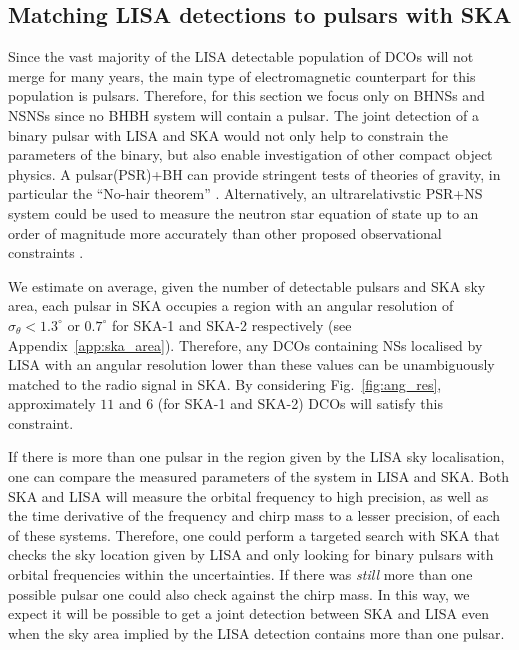 \subsection{Matching LISA detections to pulsars with SKA}\label{sec:pulsar_matching}
Since the vast majority of the LISA detectable population of DCOs will not merge for many years, the main type of electromagnetic counterpart for this population is pulsars. Therefore, for this section we focus only on BHNSs and NSNSs since no BHBH system will contain a pulsar. The joint detection of a binary pulsar with LISA and SKA would not only help to constrain the parameters of the binary, but also enable investigation of other compact object physics. A pulsar(PSR)+BH can provide stringent tests of theories of gravity, in particular the ``No-hair theorem'' \citep{Keane+2015}. Alternatively, an ultrarelativstic PSR+NS system could be used to measure the neutron star equation of state up to an order of magnitude more accurately than other proposed observational constraints \citep{Kyutoku+2019, Thrane+2020}.

We estimate on average, given the number of detectable pulsars and SKA sky area, each pulsar in SKA occupies a region with an angular resolution of $\sigma_{\theta} < 1.3^\circ$ or $0.7^\circ$ for SKA-1 and SKA-2 respectively (see Appendix~\ref{app:ska_area}). Therefore, any DCOs containing NSs localised by LISA with an angular resolution lower than these values can be unambiguously matched to the radio signal in SKA. By considering Fig.~\ref{fig:ang_res}, approximately $11$ and $6$ (for SKA-1 and SKA-2) DCOs will satisfy this constraint.

If there is more than one pulsar in the region given by the LISA sky localisation, one can compare the measured parameters of the system in LISA and SKA. Both SKA and LISA will measure the orbital frequency to high precision, as well as the time derivative of the frequency and chirp mass to a lesser precision, of each of these systems. Therefore, one could perform a targeted search with SKA that checks the sky location given by LISA and only looking for binary pulsars with orbital frequencies within the uncertainties. If there was \textit{still} more than one possible pulsar one could also check against the chirp mass. In this way, we expect it will be possible to get a joint detection between SKA and LISA even when the sky area implied by the LISA detection contains more than one pulsar.

